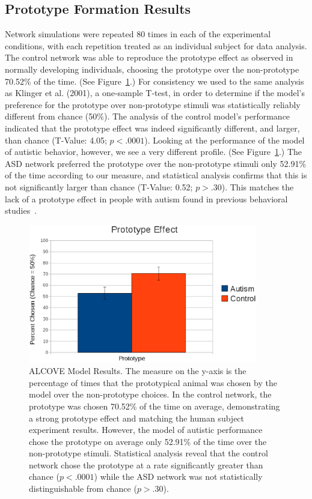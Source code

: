 \documentclass[man]{apa}
\begin{document}
\subsection{Prototype Formation Results}

Network simulations were repeated 80 times in each of the experimental conditions, with each repetition treated as an individual subject for data analysis.  The control network was able to reproduce the prototype effect as observed in normally developing individuals, choosing the prototype over the non-prototype 70.52\% of the time.  (See Figure~\ref{alcove-results}.)  For consistency we used to the same analysis as Klinger et al. (2001), a one-sample T-test, in order to determine if the model's preference for the prototype over non-prototype stimuli was statistically reliably different from chance (50\%).  The analysis of the control model's performance indicated that the prototype effect was indeed significantly different, and larger, than chance (T-Value: 4.05; $p < .0001$).   Looking at the performance of the model of autistic behavior, however, we see a very different profile. (See Figure~\ref{alcove-results}.)  The ASD network preferred the prototype over the non-prototype stimuli only 52.91\% of the time according to our measure, and statistical analysis confirms that this is not significantly larger than chance (T-Value: 0.52; $p > .30$).  This matches the lack of a prototype effect in people with autism found in previous behavioral studies~\cite{RefWorks:113,StraussMS:2009:Prototype}.

\begin{figure}[ht]
\begin{center}
	\includegraphics[width=100mm]{graphs/alcove_results.eps}
\end{center}
\caption{ALCOVE Model Results.  The measure on the y-axis is the percentage of times that the prototypical animal was chosen by the model over the non-prototype choices.  In the control network, the prototype was chosen 70.52\% of the time on average, demonstrating a strong prototype effect and matching the human subject experiment results.  However, the model of autistic performance chose the prototype on average only 52.91\% of the time over the non-prototype stimuli.  Statistical analysis reveal that the control network chose the prototype at a rate significantly greater than chance ($p < .0001$) while the ASD network was not statistically distinguishable from chance ($p > .30$).}
\label{alcove-results}
\end{figure} 
\end{document}

